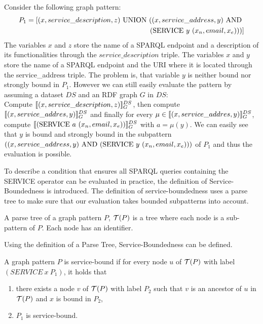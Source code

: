 \begin{example}\label{ex:boundedbad}
Consider the following graph pattern:
\begin{align*}
P_1 = [(x,service\_description,z) \mbox{ UNION } ((x,service\_address, y) \mbox{ AND }
\\\
(\mbox{SERVICE } y \ (x_n,email,x_e)))]
\end{align*}
The variables $x$ and $z$ store the name of a SPARQL endpoint and a description of its
functionalities through the $service\_description$ triple. The variables $x$ and $y$ store the
name of a SPARQL endpoint and the URI where it is located through the
service\_address triple. The problem is, that variable $y$ is neither bound nor
strongly bound in $P_1$. However we can still easily evaluate the pattern by
assuming a dataset $DS$ and an RDF graph $G$ in $DS$:\\
Compute $\llbracket (x, service\_description,z)\rrbracket^{DS}_G$, then compute \\
$\llbracket (x, service\_addres,y) \rrbracket^{DS}_G$ and finally for every
$\mu \in \llbracket (x, service\_addres,y) \rrbracket^{DS}_G$, compute $\llbracket (\mbox{SERVICE }
a \ (x_n,email,x_e))\rrbracket^{DS}_G$ with $a = \mu(y)$. We can easily see that $y$ is
bound and strongly bound in the subpattern \\ $((x,service\_address, y) \mbox{ AND }
(\mbox{SERVICE } y \ (x_n,email,x_e)))$ of $P_1$ and thus the evaluation is possible.
\end{example}

\noindent To describe a condition that ensures all SPARQL queries containing the SERVICE
operator can be evaluated in practice, the definition of Service-Boundedness is
introduced. The definition of service-boundedness uses a parse tree to make sure
that our evaluation takes bounded subpatterns into account.

\begin{definition}
	A parse tree of a graph pattern $P$, $\mathcal{T}(P)$ is a tree where each
	node is a sub-pattern of $P$. Each node has an identifier.
\end{definition}

Using the definition of a Parse Tree, Service-Boundedness can be defined.

\begin{definition}
	A graph pattern $P$ is service-bound if for every node $u$ of $\mathcal{T}(P)$ with
	label $(SERVICE \ x\  P_1)$, it holds that
	\begin{enumerate}
		\item there exists a node $v$ of $\mathcal{T}(P)$ with label $P_2$ such that $v$
			is an ancestor of $u$ in $\mathcal{T}(P)$ and $x$ is bound in $P_2$,
		\item $P_1$ is service-bound.
	\end{enumerate}
\end{definition}


